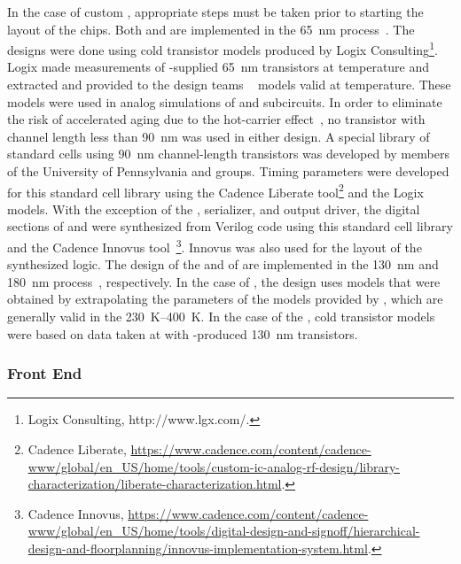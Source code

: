 In the case of custom , appropriate steps must be taken prior 
to starting the layout of the chips. Both  and 
 are implemented in the  \SI{65}{nm}  
process~\cite{TSMC65}. The designs were done using cold transistor models 
produced by Logix Consulting\footnote{Logix\texttrademark{} Consulting, http://www.lgx.com/.}.  Logix made measurements of 
-supplied  \SI{65}{nm} transistors at \lntwo 
temperature and extracted and provided to the design teams ~\cite{spice}
models valid at \lntwo temperature.  These models were used in 
analog simulations of  and  subcircuits.  
In order to eliminate the risk of accelerated aging due to the hot-carrier
effect~\cite{Hot-electron}, no transistor with channel length
less than \SI{90}{nm} was used in either  design.
A special library of standard cells using \SI{90}{nm} channel-length 
transistors was developed by members of the University
of Pennsylvania and  groups. Timing parameters were
developed for this standard cell library using the Cadence Liberate
tool\footnote{Cadence Liberate\texttrademark{}, \url{https://www.cadence.com/content/cadence-www/global/en_US/home/tools/custom-ic-analog-rf-design/library-characterization/liberate-characterization.html}. } 
and the Logix  models. With the
exception of the  , serializer, and
output driver, the digital sections of  and
 were synthesized from Verilog code using this
standard cell library and the Cadence Innovus tool~\footnote{Cadence Innovus\texttrademark{}, \url{https://www.cadence.com/content/cadence-www/global/en_US/home/tools/digital-design-and-signoff/hierarchical-design-and-floorplanning/innovus-implementation-system.html}.}. 
Innovus was also used for the layout of the synthesized logic.
The design of the   and of 
are implemented in the  \SI{130}{nm} and \SI{180}{nm} 
 process~\cite{TSMC130,TSMC180}, respectively. 
In the case of , 
the design uses models that were obtained by extrapolating the
parameters of the models provided by , which are 
generally valid in the \SIrange{230}{400}{K}. In the case of the 
, cold transistor models were based on data taken at  with
-produced \SI{130}{nm} transistors.

\subsubsection{Front End }
\label{sec:fdsp-tpcelec-design-femb-fe}

